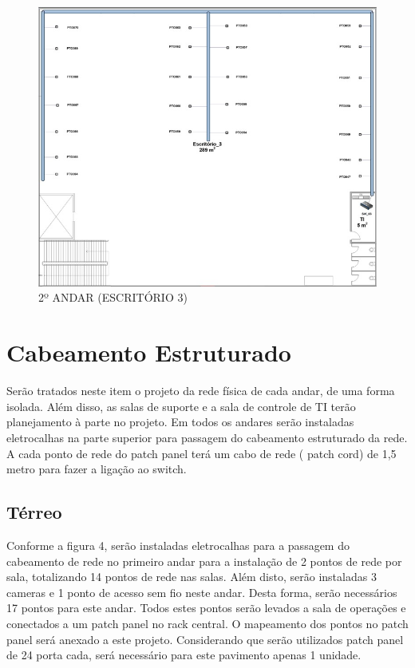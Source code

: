 \documentclass[	DIV=calc,%
							paper=a4,%
							fontsize=12pt,%
							onecolumn]{scrartcl}	 					%
\begin{document}
\begin{figure}[H]
  \centering
  \includegraphics[width=\textwidth]{piso2} 
  \caption{2º ANDAR (ESCRITÓRIO 3)}
  \label{fig:methodology}
\end{figure}


\section{Cabeamento Estruturado}
{\raggedright Serão tratados neste item o projeto da rede física de cada andar, de uma forma isolada.
Além disso, as salas de suporte e a sala de controle de TI terão planejamento à parte no projeto. Em todos os andares serão instaladas eletrocalhas na parte superior para passagem do cabeamento estruturado da rede. 
A cada ponto de rede do patch panel terá um cabo de rede ( patch cord) de 1,5 metro para fazer a ligação ao switch.
}

\subsection{Térreo}
{\raggedright Conforme a figura 4, serão instaladas eletrocalhas para a passagem do cabeamento de
rede no primeiro andar para a instalação de 2 pontos de rede por sala, totalizando 14
pontos de rede nas salas. Além disto, serão instaladas 3 cameras e 1 ponto de acesso sem
fio neste andar. Desta forma, serão necessários 17 pontos para este andar. Todos estes
pontos serão levados a sala de operações e conectados a um patch panel no rack central.
O mapeamento dos pontos no patch panel será anexado a este projeto.
Considerando que serão utilizados patch panel de 24 porta cada, será necessário para este pavimento apenas 1 unidade.}
\end{document}
